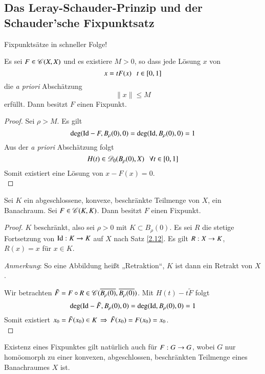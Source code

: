 \subsection{Das Leray-Schauder-Prinzip und der Schauder'sche Fixpunktsatz}

Fixpunktsätze in schneller Folge!

\begin{theorem}\label{3.12}
    Es sei $F\in \mathscr C(X,X)$ und es existiere $M>0$, so dass jede Lösung $x$ von
    \[
        x=tF(x) \hspace{.25cm} t\in [0,1]
    \]
    die \textit{a priori} Abschätzung
    \[
        \|x\|\leq M
    \]
    erfüllt. Dann besitzt $F$ einen Fixpunkt.
\end{theorem}

\begin{proof}
    Sei $\rho>M$. Es gilt
    \[
        \deg(\mathrm{Id}-F,B_\rho(0),0)=\deg(\mathrm{Id},B_\rho(0),0)=1
    \]
    Aus der \textit{a priori} Abschätzung folgt
    \[
        H(t)\in \mathscr D_0(B_\rho(0),X) \hspace{.25cm} \forall t\in [0,1]
    \]
    Somit existiert eine Lösung von $x-F(x)=0$.
    \[ \]
\end{proof}

\begin{theorem}\label{3.13}
    Sei $K$ ein abgeschlossene, konvexe, beschränkte Teilmenge von $X$, ein Banachraum. Sei
    $F\in \mathscr C(K,K)$. Dann besitzt $F$ einen Fixpunkt.
\end{theorem}

\begin{proof}
    $K$ beschränkt, also sei $\rho>0$ mit $K\subset B_\rho(0)$. Es sei $R$ die stetige Fortsetzung von
    $\mathrm{Id}:K\rightarrow K$ auf $X$ nach Satz \ref{2.12}. Es gilt $R:X\rightarrow K$, $R(x)=x$ für $x\in K$.

    \noindent\textit{Anmerkung}: So eine Abbildung heißt „Retraktion“, $K$ ist dann ein Retrakt von $X$.

    \noindent Wir betrachten $\tilde F=F\circ R\in \mathscr C(\overline{B_\rho(0)},\overline{B_\rho(0)})$. Mit $H(t)
    -t\tilde F$ folgt
    \[
        \deg(\mathrm{Id}-\tilde F, B_\rho(0),0)=\deg(\mathrm{Id},B_\rho(0),0)=1
    \]
    Somit existiert $x_0=\tilde F(x_0)\in K \, \Rightarrow \, \tilde F(x_0)=F(x_0)=x_0$. 
    \[ \]
\end{proof}

\begin{remark}
    Existenz eines Fixpunktes gilt natürlich auch für $F:G\rightarrow G$, wobei $G$ nur homöomorph zu einer
    konvexen, abgeschlossen, beschränkten Teilmenge eines Banachraumes $X$ ist.
\end{remark}

